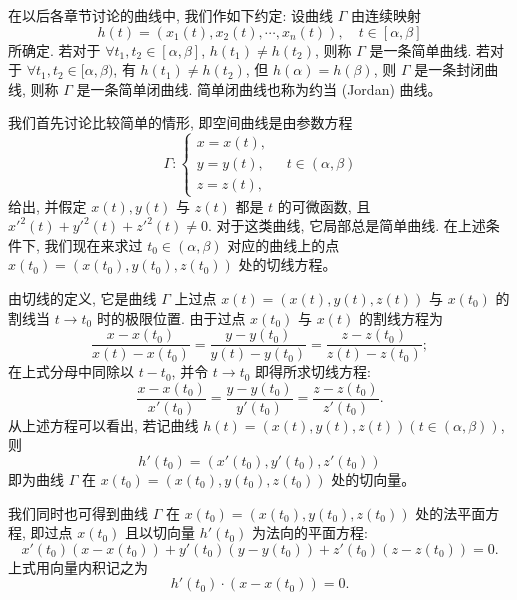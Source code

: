 \documentclass[UTF8, 12pt, fontset=fandol, oneside]{ctexart}
\begin{document}
在以后各章节讨论的曲线中, 我们作如下约定: 设曲线 $\Gamma$ 由连续映射
\[
  h(t)=(x_1(t),x_2(t),\cdots,x_n(t)),\quad t\in[\alpha,\beta]
\]
所确定. 若对于 $\forall t_1,t_2\in[\alpha,\beta]$, $h(t_1)\ne h(t_2)$, 则称 $\Gamma$ 是一条简单曲线. 若对于 $\forall t_1,t_2\in[\alpha,\beta)$, 有 $h(t_1)\ne h(t_2)$, 但 $h(\alpha)=h(\beta)$, 则 $\Gamma$ 是一条封闭曲线, 则称 $\Gamma$ 是一条简单闭曲线. 简单闭曲线也称为约当 (Jordan) 曲线。

我们首先讨论比较简单的情形, 即空间曲线是由参数方程
\[
  \Gamma:
  \begin{cases}
    x=x(t),\\
    y=y(t),\\
    z=z(t),
  \end{cases}
  \quad t\in(\alpha,\beta)
\]
给出, 并假定 $x(t),y(t)$ 与 $z(t)$ 都是 $t$ 的可微函数, 且 $x'^2(t)+y'^2(t)+z'^2(t)\ne0$. 对于这类曲线, 它局部总是简单曲线. 在上述条件下, 我们现在来求过 $t_0\in(\alpha,\beta)$ 对应的曲线上的点 $x(t_0)=(x(t_0),y(t_0),z(t_0))$ 处的切线方程。

由切线的定义, 它是曲线 $\Gamma$ 上过点 $x(t)=(x(t),y(t),z(t))$ 与 $x(t_0)$ 的割线当 $t\to t_0$ 时的极限位置. 由于过点 $x(t_0)$ 与 $x(t)$ 的割线方程为
\[
  \frac{x-x(t_0)}{x(t)-x(t_0)}
  =
  \frac{y-y(t_0)}{y(t)-y(t_0)}
  =
  \frac{z-z(t_0)}{z(t)-z(t_0)};
\]
在上式分母中同除以 $t-t_0$, 并令 $t\to t_0$ 即得所求切线方程:
\[
  \frac{x-x(t_0)}{x'(t_0)}
  =
  \frac{y-y(t_0)}{y'(t_0)}
  =
  \frac{z-z(t_0)}{z'(t_0)}.
\]
从上述方程可以看出, 若记曲线 $h(t)=(x(t),y(t),z(t))(t\in(\alpha,\beta))$, 则
\[
  h'(t_0)=(x'(t_0),y'(t_0),z'(t_0))
\]
即为曲线 $\Gamma$ 在 $x(t_0)=(x(t_0),y(t_0),z(t_0))$ 处的切向量。

我们同时也可得到曲线 $\Gamma$ 在 $x(t_0)=(x(t_0),y(t_0),z(t_0))$ 处的法平面方程, 即过点 $x(t_0)$ 且以切向量 $h'(t_0)$ 为法向的平面方程:
\[
  x'(t_0)(x-x(t_0))+y'(t_0)(y-y(t_0))+z'(t_0)(z-z(t_0))=0.
\]
上式用向量内积记之为
\[
  h'(t_0)\cdot(x-x(t_0))=0.
\]
\end{document}
